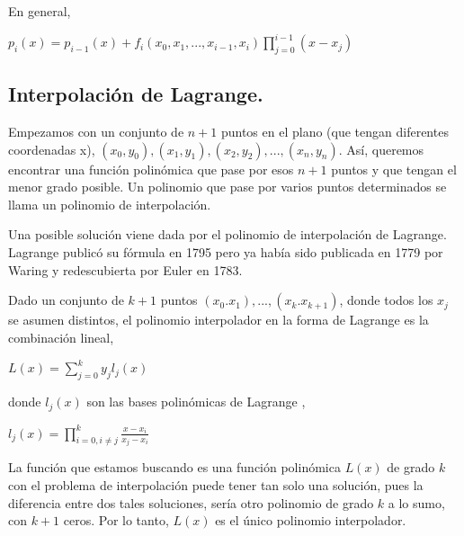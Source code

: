 \hspace{0.4cm} En general,

\begin{center}
$\displaystyle{p_{i}(x) = p_{i-1}(x) +  f_{i} (x_{0},x_{1},...,x_{i-1},x_{i}) \prod_{j=0}^{i-1}(x-x_{j})}$
\end{center}


\subsection{Interpolaci\'on de Lagrange.\\}

\hspace{0.4cm} Empezamos con un conjunto de $n+1$ puntos en el plano (que tengan diferentes coordenadas x), $(x_{0}, y_{0}), (x_{1}, y_{1}), (x_{2}, y_{2}),...,(x_{n}, y_{n})$. As\'i, queremos encontrar una funci\'on polin\'omica que pase por esos $n+1$ puntos y que tengan el menor grado posible. Un polinomio que pase por varios puntos determinados se llama un polinomio de interpolaci\'on.

\hspace{0.4cm} Una posible soluci\'on viene dada por el  polinomio de interpolaci\'on de Lagrange. Lagrange public\'o su f\'ormula en 1795 pero ya hab\'ia sido publicada en 1779 por Waring y redescubierta por Euler en 1783.

\hspace{0.4cm} Dado un conjunto de $k + 1$ puntos $(x_{0}.x_{1}),...,(x_{k}.x_{k+1})$, donde todos los $x_{j}$ se asumen distintos, el polinomio interpolador en la forma de Lagrange es la combinaci\'on lineal,

\begin{center}
$\displaystyle{L(x) = \sum_{j=0}^{k} y_{j} l_{j}(x)}$
\end{center}

\vspace{0.2cm}

\noindent donde $ l_{j}(x)$ son las bases polin\'omicas de Lagrange ,


\vspace{0.2cm}

\begin{center}
$\displaystyle{l_{j}(x) = \prod_{i=0,i \neq j}^{k} \frac{x-x_{i}}{x_{j}-x_{i}}  }$
\end{center}

\vspace{0.2cm}


\hspace{0.4cm} La funci\'on que estamos buscando es una funci\'on polin\'omica $L(x)$ de grado $k$ con el problema de interpolaci\'on puede tener tan solo una soluci\'on, pues la diferencia entre dos tales soluciones, ser\'ia otro polinomio de grado $k$ a lo sumo, con $k+1$ ceros. Por lo tanto, $L(x)$ es el \'unico polinomio interpolador.


